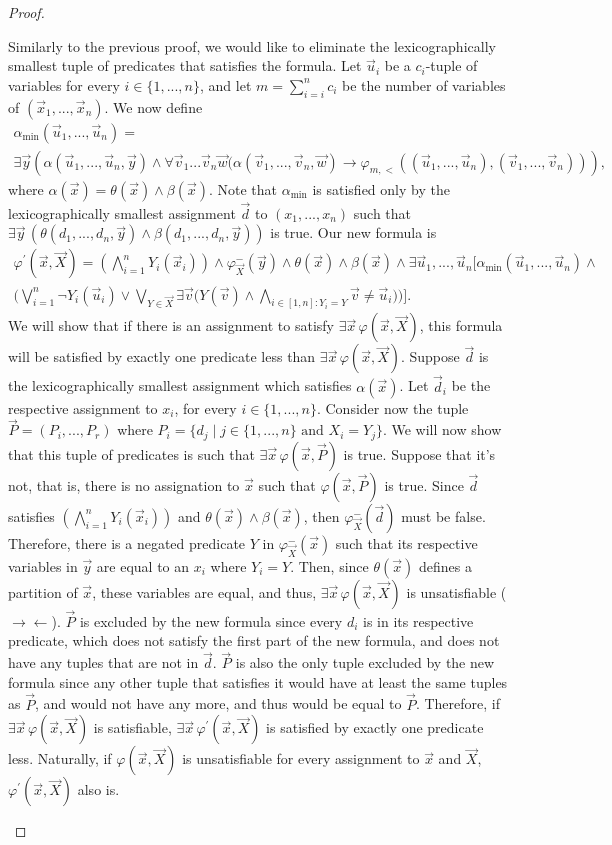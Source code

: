\documentclass[12pt]{article}
\def\P{\vec{P}}
\def\X{\vec{X}}
\def\d{\vec{d}}
\def\u{\vec{u}}
\def\v{\vec{v}}
\def\w{\vec{w}}
\def\x{\vec{x}}
\def\y{\vec{y}}
\begin{document}
\begin{proof}
\begin{enumerate}
Similarly to the previous proof, we would like to eliminate the lexicographically smallest tuple of predicates that satisfies the formula. Let $\u_i$ be a $c_i$-tuple of variables for every $i \in \{1,...,n\}$, and let $m = \sum_{i = i}^n c_i$ be the number of variables of $(\x_1,...,\x_n)$. We now define
\begin{multline*}
\alpha_{\min}(\u_1,...,\u_n) = \\ \exists\y\left( \alpha(\u_1,...,\u_n,\y)\wedge \forall\v_1...\v_n\w(\alpha(\v_1,...,\v_n,\w)\rightarrow \varphi_{m,<}((\u_1,...,\u_n),(\v_1,...,\v_n))\right),
\end{multline*}
where $\alpha(\x) = \theta(\x) \wedge \beta(\x)$. Note that $\alpha_{\min}$ is satisfied only by the lexicographically \linebreak smallest assignment $\d$ to $(x_1,...,x_n)$ such that $\exists\y\,(\theta(d_1,...,d_n,\y)\wedge\beta(d_1,...,d_n,\y))$ is true. Our new formula is
\begin{multline*}
\varphi^\prime(\x,\X) = \left( \bigwedge_{i=1}^n Y_i(\x_i) \right) \wedge \varphi_{\X}^{-}(\y) \wedge \theta(\x) \wedge \beta(\x)\wedge\exists\u_1,...,\u_n\bigg[\alpha_{\min}(\u_1,...,\u_n) \wedge \\ \bigg(\bigvee_{i = 1}^{n}\neg Y_i(\u_i) \vee \bigvee_{Y\in\X} \exists \v\Big( Y(\v) \wedge \bigwedge_{i\in[1,n]: Y_i = Y} \v \neq \u_i\Big) \bigg) \bigg].
\end{multline*}
We will show that if there is an assignment to satisfy $\exists\x\,\varphi(\x,\X)$, this formula will be satisfied by exactly one predicate less than $\exists\x\,\varphi(\x,\X)$. Suppose $\d$ is the lexicographically smallest assignment which satisfies $\alpha(\x)$. Let $\d_i$ be the respective assignment to $x_i$, for every $i\in\{1,...,n\}$. Consider now the tuple $\P = (P_i,...,P_r)$ where $P_i = \{d_j \mid j\in\{1,...,n\} \text{ and } X_i = Y_j \}$. We will now show that this tuple of predicates is such that $\exists\x\,\varphi(\x,\P)$ is true. Suppose that it's not, that is, there is no assignation to $\x$ such that $\varphi(\x,\P)$ is true. Since $\d$ satisfies $\left( \bigwedge_{i=1}^n Y_i(\x_i) \right)$ and $\theta(\x) \wedge \beta(\x)$, then $\varphi_{\X}^{-}(\d)$ must be false. Therefore, there is a negated predicate $Y$ in $\varphi_{\X}^{-}(\x)$ such that its respective variables in $\y$ are equal to an $x_i$ where $Y_i = Y$. Then, since $\theta(\x)$ defines a partition of $\x$, these variables are equal, and thus, $\exists\x\,\varphi(\x,\X)$ is unsatisfiable ($\rightarrow\leftarrow$). $\P$ is excluded by the new formula since every $d_i$ is in its respective predicate, which does not satisfy the first part of the new formula, and does not have any tuples that are not in $\d$. $\P$ is also the only tuple excluded by the new formula since any other tuple that satisfies it would have at least the same tuples as $\P$, and would not have any more, and thus would be equal to $\P$. Therefore, if $\exists\x\,\varphi(\x,\X)$ is satisfiable, $\exists\x\,\varphi^\prime(\x,\X)$ is satisfied by exactly one predicate less. Naturally, if $\varphi(\x,\X)$ is unsatisfiable for every assignment to $\x$ and $\X$, $\varphi^\prime(\x,\X)$ also is.


\end{enumerate}
\end{proof}
\end{document}
